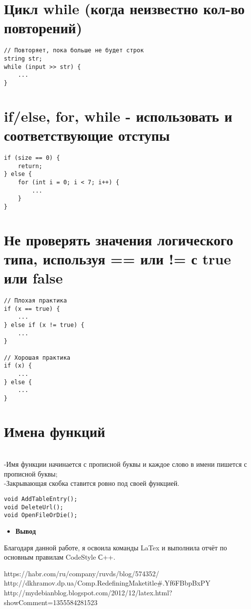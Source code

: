 \documentclass[12pt, letterpaper]{article}
\begin{document}
\section{Цикл while (когда неизвестно кол-во повторений)}
\begin{verbatim}
// Повторяет, пока больше не будет строк
string str;
while (input >> str) {
    ...
}
\end{verbatim}
\vspace*{20mm}
\section{if/else, for, while - использовать {} и соответствующие отступы}
\begin{verbatim}
if (size == 0) {
    return;
} else {
    for (int i = 0; i < 7; i++) {
        ...
    }
}
\end{verbatim}
\section{Не проверять значения логического типа, используя == или != с true или false}
\begin{verbatim}
// Плохая практика
if (x == true) {
    ...
} else if (x != true) {
    ...
}

// Хорошая практика
if (x) {
    ...
} else {
    ...
}
\end{verbatim}
\section{Имена функций}
\\-Имя функции начинается с прописной буквы и каждое слово в имени пишется с прописной буквы;
\\-Закрывающая скобка ставится ровно под своей функцией.
\begin{verbatim}
void AddTableEntry();
void DeleteUrl();
void OpenFileOrDie();
\end{verbatim}
\newpage
\begin{itemize}
\item\Large\textbf{Вывод}
\end{itemize}
Благодаря данной работе, я освоила команды LaTex и выполнила отчёт по основным правилам CodeStyle С++. 
\begin{thebibliography}{3}
     https://habr.com/ru/company/ruvds/blog/574352/
     http://dkhramov.dp.ua/Comp.RedefiningMaketitle#.Yf6FBbpBxPY
     http://mydebianblog.blogspot.com/2012/12/latex.html?showComment=1355584281523
\end{thebibliography}
\end{document}
